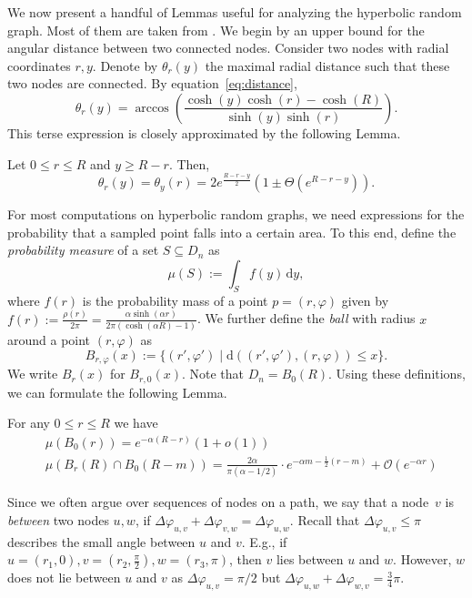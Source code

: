 \documentclass{llncs}
\newcommand{\Oh}{\mathcal{O}}
\newcommand{\dif}{\,\mathrm{d}}
\newcommand{\dist}{\mathrm{d}}
\newcommand{\eq}[1]{equation~\eqref{eq:#1}}
\renewcommand{\leq}{\leqslant}
\renewcommand{\geq}{\geqslant}
\begin{document}
We now present a handful of Lemmas useful for analyzing the hyperbolic random graph. Most of them are taken from \cite{gugelmann2012random}. We begin by an upper bound for the angular distance between two connected nodes. Consider two nodes with radial coordinates $r,y$. Denote by $\theta_r(y)$ the maximal radial distance such that these two nodes are connected. By \eq{distance}, 
\begin{equation}
\theta_r(y) = \arccos\left(\frac{\cosh(y) \cosh(r) - \cosh(R)}{\sinh(y)\sinh(r)} \right). \label{eq:maxangle}
\end{equation}
This terse expression is closely approximated by the following Lemma.
\begin{lemma}
\label{lem:maxangle}
Let $0\leq r \leq R$ and $y \geq R -r$. Then,
$$\theta_r(y) = \theta_y(r) = 2e^{\frac{R-r-y}2} (1 \pm \Theta(e^{R-r-y})). $$
\end{lemma} 
For most computations on hyperbolic random graphs, we need expressions for the probability that a sampled point falls into a certain area. To this end, \citet{gugelmann2012random} define the {\em probability measure} of a set $S \subseteq D_n$ as
$$\mu(S) := \int_S f(y) \dif y,$$
where $f(r)$ is the probability mass of a point $p=(r,\varphi)$ given by $f(r) := \tfrac{\rho(r)}{2\pi} = \frac{\alpha \sinh (\alpha r)}{2\pi(\cosh(\alpha R) -1)}$.
We further define the {\em ball} with radius $x$ around a point $(r,\varphi)$ as
$$B_{r,\varphi}(x) := \{ (r', \varphi') \mid \dist((r',\varphi'),(r,\varphi)) \leq x\}.$$
We write $B_r(x)$ for $B_{r,0}(x)$. Note that $D_n = B_0(R)$. Using these definitions, we can formulate the following Lemma.
\begin{lemma}
\label{lem:intersection}
For any $0 \leq r \leq R$ we have
\begin{align}
&\mu(B_0(r)) = e^{-\alpha(R-r)}(1+o(1)) \label{eq:smallball} \\
&\mu(B_r(R) \cap B_0(R-m)) = \tfrac{2\alpha}{\pi(\alpha - 1/2)} \cdot e^{-\alpha m - \frac12(r - m)} + \Oh(e^{-\alpha r}) \label{eq:lens}
\end{align}
\end{lemma}
Since we often argue over sequences of nodes on a path, we say that a node~$v$ is {\em between} two nodes $u,w$, if $ \Delta\varphi_{u,v} + \Delta\varphi_{v,w} = \Delta\varphi_{u,w}.$ 
Recall that $\Delta\varphi_{u,v} \leq \pi$ describes the small angle between $u$ and $v$. E.g., if $u = (r_1, 0), v = (r_2, \tfrac\pi2), w = (r_3, \pi)$, then $v$ lies between $u$ and $w$. However, $w$ does not lie between $u$ and $v$ as $\Delta\varphi_{u,v} = \pi/2$ but $\Delta\varphi_{u,w} + \Delta\varphi_{w,v} = \tfrac34 \pi$.
\end{document}
